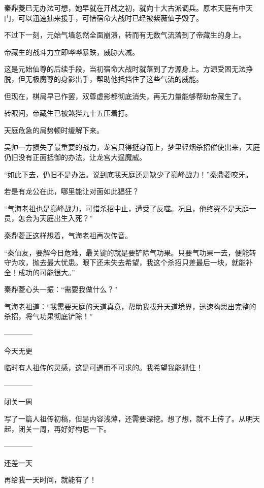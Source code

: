 \begin{this_body}
秦鼎菱已无办法可想，她早就在开战之初，就向十大古派调兵。原本天庭有中天门，可以迅速抽来援手，可惜宿命大战时已经被紫薇仙子毁了。

不过下一刻，元始气墙忽然全面崩溃，转而有无数气流落到了帝藏生的身上。

帝藏生的战斗力立即哗哗暴跌，威胁大减。

这是元始仙尊的后续手段，当初宿命大战时就落到了方源身上。方源受困无法挣脱，但无极魔尊的身影出手，帮助他抵挡住了这些气流的威能。

但现在，棋局早已作罢，双尊虚影都彻底消失，再无力量能够帮助帝藏生了。

转眼间，帝藏生已被煞狴九十五压着打。

天庭危急的局势顿时缓解下来。

吴帅一方损失了最重要的战力，龙宫只得挺身而上，梦里轻烟杀招催使出来，天庭仍旧没有正面抵御的办法，让龙宫大逞魔威。

“如此下去，仍旧不是办法。说到底我天庭还是缺少了巅峰战力！”秦鼎菱咬牙。

若是有龙公在此，哪里能让对面如此猖狂？

“气海老祖也是巅峰战力，可惜杀招中止，遭受了反噬。况且，他终究不是天庭一员，怎会为天庭出生入死？”

秦鼎菱正这样想着，气海老祖再次传音。

“秦仙友，要解今日危难，最关键的就是要铲除气功果。只要气功果一去，便能转守为攻，抛去最大忧患。眼下还未失去希望，我这个杀招只差最后一块，就能补全！成功的可能很大。”

秦鼎菱心头一振：“需要我做什么？”

气海老祖道：“我需要天庭的天道真意，帮助我拔升天道境界，迅速构思出完整的杀招，将气功果彻底铲除！”

------------

今天无更

临时有人祖传的灵感，这是可遇而不可求的。我希望我能抓住！

------------

闭关一周

写了一篇人祖传初稿，但是内容浅薄，还需要深挖。想了想，就不上传了。从明天起，闭关一周，再好好构思一下。

------------

还差一天

再给我一天时间，就能有了！

\end{this_body}


